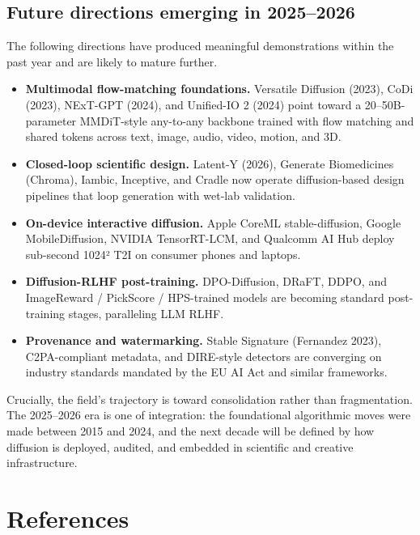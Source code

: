 \subsection{Future directions emerging in 2025--2026}\label{future-directions-emerging-in-20252026}

The following directions have produced meaningful demonstrations within the past year and are likely to mature further.

\begin{itemize}
\tightlist
\item
  \textbf{Multimodal flow-matching foundations.} Versatile Diffusion (2023), CoDi (2023), NExT-GPT (2024), and Unified-IO 2 (2024) point toward a 20--50B-parameter MMDiT-style any-to-any backbone trained with flow matching and shared tokens across text, image, audio, video, motion, and 3D.
\item
  \textbf{Closed-loop scientific design.} Latent-Y (2026), Generate Biomedicines (Chroma), Iambic, Inceptive, and Cradle now operate diffusion-based design pipelines that loop generation with wet-lab validation.
\item
  \textbf{On-device interactive diffusion.} Apple CoreML stable-diffusion, Google MobileDiffusion, NVIDIA TensorRT-LCM, and Qualcomm AI Hub deploy sub-second 1024² T2I on consumer phones and laptops.
\item
  \textbf{Diffusion-RLHF post-training.} DPO-Diffusion, DRaFT, DDPO, and ImageReward / PickScore / HPS-trained models are becoming standard post-training stages, paralleling LLM RLHF.
\item
  \textbf{Provenance and watermarking.} Stable Signature (Fernandez 2023), C2PA-compliant metadata, and DIRE-style detectors are converging on industry standards mandated by the EU AI Act and similar frameworks.
\end{itemize}

Crucially, the field's trajectory is toward consolidation rather than fragmentation. The 2025--2026 era is one of integration: the foundational algorithmic moves were made between 2015 and 2024, and the next decade will be defined by how diffusion is deployed, audited, and embedded in scientific and creative infrastructure.

\section{References}\label{references}

